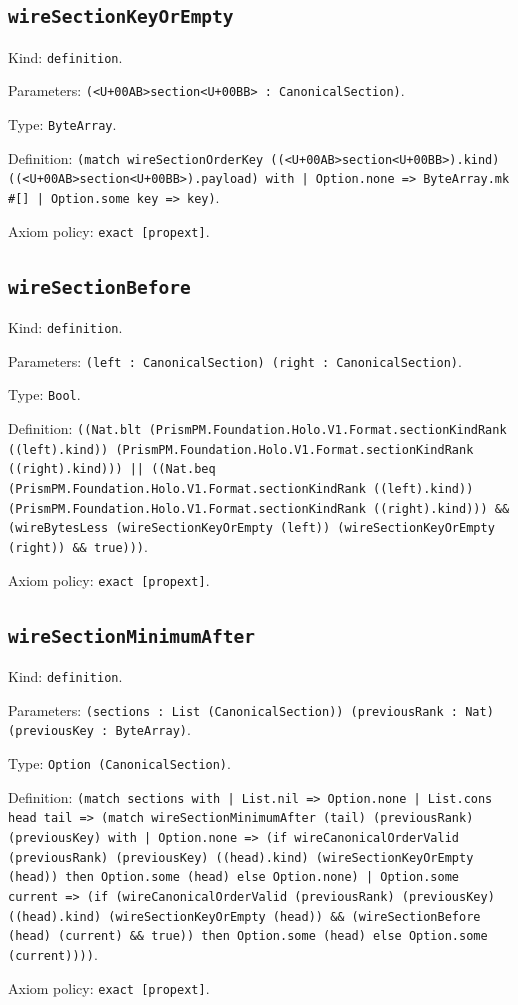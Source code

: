 \documentclass[11pt]{article}
\begin{document}
\subsection*{\texttt{wireSectionKeyOrEmpty}}
\noindent Kind: \texttt{definition}.\par
\noindent Parameters: \texttt{(<U+00AB>section<U+00BB> : CanonicalSection)}.\par
\noindent Type: \texttt{ByteArray}.\par
\noindent Definition: \texttt{(match wireSectionOrderKey ((<U+00AB>section<U+00BB>).kind) ((<U+00AB>section<U+00BB>).payload) with | Option.none => ByteArray.mk \#[] | Option.some key => key)}.\par
\noindent Axiom policy: \texttt{exact [propext]}.\par
\subsection*{\texttt{wireSectionBefore}}
\noindent Kind: \texttt{definition}.\par
\noindent Parameters: \texttt{(left : CanonicalSection) (right : CanonicalSection)}.\par
\noindent Type: \texttt{Bool}.\par
\noindent Definition: \texttt{((Nat.blt (PrismPM.Foundation.Holo.V1.Format.sectionKindRank ((left).kind)) (PrismPM.Foundation.Holo.V1.Format.sectionKindRank ((right).kind))) || ((Nat.beq (PrismPM.Foundation.Holo.V1.Format.sectionKindRank ((left).kind)) (PrismPM.Foundation.Holo.V1.Format.sectionKindRank ((right).kind))) \&\& (wireBytesLess (wireSectionKeyOrEmpty (left)) (wireSectionKeyOrEmpty (right)) \&\& true)))}.\par
\noindent Axiom policy: \texttt{exact [propext]}.\par
\subsection*{\texttt{wireSectionMinimumAfter}}
\noindent Kind: \texttt{definition}.\par
\noindent Parameters: \texttt{(sections : List (CanonicalSection)) (previousRank : Nat) (previousKey : ByteArray)}.\par
\noindent Type: \texttt{Option (CanonicalSection)}.\par
\noindent Definition: \texttt{(match sections with | List.nil => Option.none | List.cons head tail => (match wireSectionMinimumAfter (tail) (previousRank) (previousKey) with | Option.none => (if wireCanonicalOrderValid (previousRank) (previousKey) ((head).kind) (wireSectionKeyOrEmpty (head)) then Option.some (head) else Option.none) | Option.some current => (if (wireCanonicalOrderValid (previousRank) (previousKey) ((head).kind) (wireSectionKeyOrEmpty (head)) \&\& (wireSectionBefore (head) (current) \&\& true)) then Option.some (head) else Option.some (current))))}.\par
\noindent Axiom policy: \texttt{exact [propext]}.\par
\end{document}
